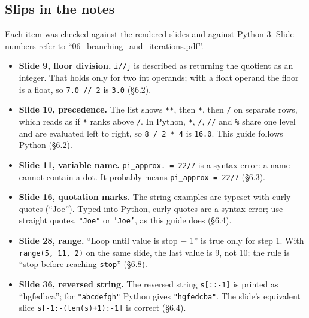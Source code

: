\documentclass[11pt]{article}
\begin{document}
\begin{keepsection}
\section{Slips in the notes}

Each item was checked against the rendered slides and against Python 3. Slide numbers refer to “06\_branching\_and\_iterations.pdf”.

\begin{itemize}
\item \textbf{Slide 9, floor division.} \texttt{i//j} is described as returning the quotient as an integer. That holds only for two int operands; with a float operand the floor is a float, so \texttt{7.0 // 2} is \texttt{3.0} (§6.2).
\item \textbf{Slide 10, precedence.} The list shows \texttt{**}, then \texttt{*}, then \texttt{/} on separate rows, which reads as if \texttt{*} ranks above \texttt{/}. In Python, \texttt{*}, \texttt{/}, \texttt{//} and \texttt{\%} share one level and are evaluated left to right, so \texttt{8 / 2 * 4} is \texttt{16.0}. This guide follows Python (§6.2).
\item \textbf{Slide 11, variable name.} \texttt{pi\_approx. = 22/7} is a syntax error: a name cannot contain a dot. It probably means \texttt{pi\_approx = 22/7} (§6.3).
\item \textbf{Slide 16, quotation marks.} The string examples are typeset with curly quotes (“Joe”). Typed into Python, curly quotes are a syntax error; use straight quotes, \texttt{"Joe"} or \texttt{'Joe'}, as this guide does (§6.4).
\item \textbf{Slide 28, range.} “Loop until value is stop \ensuremath{-} 1” is true only for step 1. With \texttt{range(5, 11, 2)} on the same slide, the last value is 9, not 10; the rule is “stop before reaching \texttt{stop}” (§6.8).
\item \textbf{Slide 36, reversed string.} The reversed string \texttt{s[::-1]} is printed as “hgfedbca”; for \texttt{"abcdefgh"} Python gives \texttt{"hgfedcba"}. The slide’s equivalent slice \texttt{s[-1:-(len(s)+1):-1]} is correct (§6.4).
\end{itemize}
\end{keepsection}
\end{document}
